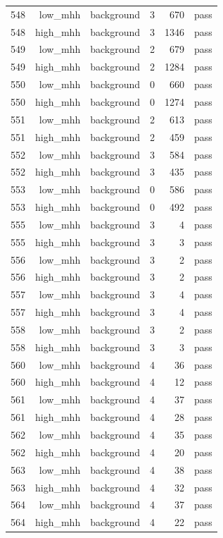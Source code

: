 \begin{table}[htbp]
{\begin{tabular}{lrrrrr}
548 & low\_mhh & background & 3 & 670 & pass \\
548 & high\_mhh & background & 3 & 1346 & pass \\
549 & low\_mhh & background & 2 & 679 & pass \\
549 & high\_mhh & background & 2 & 1284 & pass \\
550 & low\_mhh & background & 0 & 660 & pass \\
550 & high\_mhh & background & 0 & 1274 & pass \\
551 & low\_mhh & background & 2 & 613 & pass \\
551 & high\_mhh & background & 2 & 459 & pass \\
552 & low\_mhh & background & 3 & 584 & pass \\
552 & high\_mhh & background & 3 & 435 & pass \\
553 & low\_mhh & background & 0 & 586 & pass \\
553 & high\_mhh & background & 0 & 492 & pass \\
555 & low\_mhh & background & 3 & 4 & pass \\
555 & high\_mhh & background & 3 & 3 & pass \\
556 & low\_mhh & background & 3 & 2 & pass \\
556 & high\_mhh & background & 3 & 2 & pass \\
557 & low\_mhh & background & 3 & 4 & pass \\
557 & high\_mhh & background & 3 & 4 & pass \\
558 & low\_mhh & background & 3 & 2 & pass \\
558 & high\_mhh & background & 3 & 3 & pass \\
560 & low\_mhh & background & 4 & 36 & pass \\
560 & high\_mhh & background & 4 & 12 & pass \\
561 & low\_mhh & background & 4 & 37 & pass \\
561 & high\_mhh & background & 4 & 28 & pass \\
562 & low\_mhh & background & 4 & 35 & pass \\
562 & high\_mhh & background & 4 & 20 & pass \\
563 & low\_mhh & background & 4 & 38 & pass \\
563 & high\_mhh & background & 4 & 32 & pass \\
564 & low\_mhh & background & 4 & 37 & pass \\
564 & high\_mhh & background & 4 & 22 & pass \\

\end{tabular}}
\end{table}
